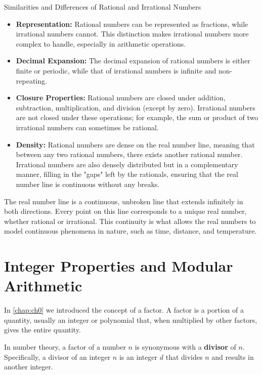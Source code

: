 \begin{custombox}{Similarities and Differences of Rational and Irrational Numbers}
    \begin{itemize}
    \item \textbf{Representation:} Rational numbers can be represented as fractions, while irrational numbers cannot. This distinction makes irrational numbers more complex to handle, especially in arithmetic operations.

    \item \textbf{Decimal Expansion:} The decimal expansion of rational numbers is either finite or periodic, while that of irrational numbers is infinite and non-repeating.

    \item \textbf{Closure Properties:} Rational numbers are closed under addition, subtraction, multiplication, and division (except by zero). Irrational numbers are not closed under these operations; for example, the sum or product of two irrational numbers can sometimes be rational.

    \item \textbf{Density:} Rational numbers are dense on the real number line, meaning that between any two rational numbers, there exists another rational number. Irrational numbers are also densely distributed but in a complementary manner, filling in the "gaps" left by the rationals, ensuring that the real number line is continuous without any breaks.
\end{itemize}
\end{custombox}

The real number line is a continuous, unbroken line that extends infinitely in both directions. Every point on this line corresponds to a unique real number, whether rational or irrational. This continuity is what allows the real numbers to model continuous phenomena in nature, such as time, distance, and temperature.

\section{Integer Properties and Modular Arithmetic}
In \ref{chap:ch0} we introduced the concept of a factor. A factor is a portion of a quantity, usually an integer or polynomial that, when multiplied by other factors, gives the entire quantity.

In number theory, a factor of a number \(n\) is synonymous with a \textbf{divisor} of \(n\). Specifically, a divisor of an integer \(n\) is an integer \(d\) that divides \(n\) and results in another integer.

